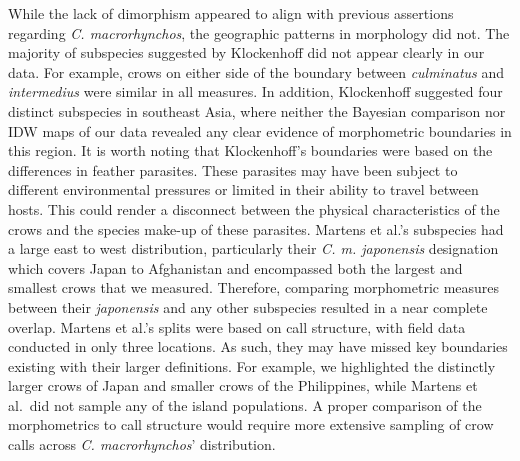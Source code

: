 \documentclass[10pt,a4paper]{article}
\begin{document}
While the lack of dimorphism appeared to align with previous assertions regarding \emph{C. macrorhynchos}, the geographic patterns in morphology did not.
The majority of subspecies suggested by Klockenhoff did not appear clearly in our data.
For example, crows on either side of the boundary between \emph{culminatus} and \emph{intermedius} were similar in all measures.
In addition, Klockenhoff suggested four distinct subspecies in southeast Asia, where neither the Bayesian comparison nor IDW maps of our data revealed any clear evidence of morphometric boundaries in this region.
It is worth noting that Klockenhoff's boundaries were based on the differences in feather parasites.
These parasites may have been subject to different environmental pressures or limited in their ability to travel between hosts.
This could render a disconnect between the physical characteristics of the crows and the species make-up of these parasites.
Martens et al.'s subspecies had a large east to west distribution, particularly their \emph{C. m. japonensis} designation which covers Japan to Afghanistan and encompassed both the largest and smallest crows that we measured.
Therefore, comparing morphometric measures between their \emph{japonensis} and any other subspecies resulted in a near complete overlap.
Martens et al.'s splits were based on call structure, with field data conducted in only three locations.
As such, they may have missed key boundaries existing with their larger definitions.
For example, we highlighted the distinctly larger crows of Japan and smaller crows of the Philippines, while Martens et al.~did not sample any of the island populations.
A proper comparison of the morphometrics to call structure would require more extensive sampling of crow calls across \emph{C. macrorhynchos}' distribution.
\end{document}
